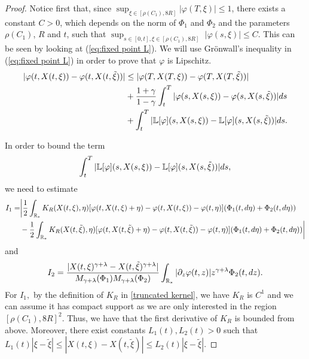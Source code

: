\documentclass[11pt]{article}
\numberwithin{equation}{section}
\theoremstyle{plain}
\newcommand{\der}{\textup{d}}
\begin{document}
\begin{proof}
Notice first that, since $\sup_{ \xi\in[\rho(C_1),8R]}|\varphi(T,\xi)|\leq 1$, there exists a constant $C>0$, which depends on the norm of $\Phi_{1}$ and $\Phi_{2}$ and the parameters  $\rho(C_{1})$, $R$ and $t$, such that $\sup_{s\in[0,t],\xi\in [\rho(C_1),8R]}$ $|\varphi(s,\xi)|\leq C$. This can be seen by looking at (\ref{eq:fixed point L}). We will use Gr\"{o}nwall's inequality in (\ref{eq:fixed point L}) in order to prove that $\varphi$ is Lipschitz.
\begin{align*}
 |\varphi(t,X(t,\xi))-\varphi(t,X(t,\tilde{\xi}))|&\leq |\varphi(T,X(T,\xi))-\varphi(T,X(T,\tilde{\xi}))|\\
 &+\frac{1+\gamma}{1-\gamma}   \int_t^T  |\varphi(s, X(s, \xi))-\varphi(s,X(s,\tilde{\xi}))| \der s\\
&+\int_{t}^{T}|\mathbb L [\varphi] (s, X(s,\xi))-\mathbb L [\varphi] (s, X(s,\tilde{\xi}))|\der s.
\end{align*}

In order to bound the term
\begin{align*}
    \int_{t}^{T}|\mathbb L [\varphi] (s, X(s,\xi))-\mathbb L [\varphi] (s, X(s,\tilde{\xi}))|\der s,
\end{align*}
we need to estimate
\begin{align*}
    I_{1}=& \bigg|\frac{1}{2}\int_{\mathbb R_*} K_{R}(X(t,\xi),\eta)[\varphi(t,X(t,\xi)+\eta)-\varphi(t,X(t,\xi))-\varphi(t,\eta)](\Phi_{1}(t, \der \eta)+\Phi_{2}(t, \der \eta)) 
    \\&-\frac{1}{2}\int_{\mathbb R_*} K_{R}(X(t,\tilde{\xi}),\eta)[\varphi(t,X(t,\tilde{\xi})+\eta)-\varphi(t,X(t,\tilde{\xi}))-\varphi(t,\eta)](\Phi_{1}(t, \der \eta)+\Phi_{2}(t, \der \eta))\bigg|
\end{align*}
and
\begin{align*}
  I_{2}= \frac{|X(t,\xi)^{\gamma+\lambda}-X(t,\tilde{\xi})^{\gamma+\lambda}|}{M_{\gamma+\lambda}(\Phi_1)  M_{\gamma+\lambda}(\Phi_2)  } \int_{\mathbb R_*} |\partial_z \varphi(t, z)| z^{\gamma+\lambda} \Phi_2(t, \der z).
   \end{align*}
   For $I_{1},$ by the definition of
    $K_{R}$ in \eqref{truncated kernel}, we have $K_{R}$ is $C^{1}$ and we can assume it has compact support as we are only interested in the region $[\rho(C_{1}),8R]^{2}$. Thus,  we have that the first derivative of $K_{R}$ is bounded from above. Moreover, there exist constants $L_{1}(t), L_{2}(t)>0$ such that $L_{1}(t)|\xi-\tilde{\xi}|\leq |X(t,\xi)-X(t,\tilde{\xi})|\leq L_{2}(t)|\xi-\tilde{\xi}|$.
   

\end{proof}
\end{document}
